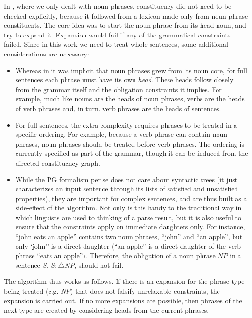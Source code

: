 \documentclass{llncs}
\newcommand{\obligation}[2]{\textit{#1} : \triangle \textit{#2}}
\begin{document}
In \cite {DM12}, where we only dealt with noun phrases, constituency did not need to be checked explicitly, because it followed from a lexicon made only from noun phrase constituents. The core idea was to start the noun phrase from its head noun, and try to expand it. Expansion would fail if any of the grammatical constraints failed. Since in this work we need to treat whole sentences, some additional considerations are necessary:
\begin{itemize}
  \item Whereas in \cite {DM12} it was implicit that noun phrases grew from its noun core, for full sentences each phrase must have its own \emph{head}. These heads follow closely from the grammar itself and the obligation constraints it implies. For example, much like nouns are the heads of noun phrases, verbs are the heads of verb phrases and, in turn, verb phrases are the heads of sentences.
  
  \item For full sentences, the extra complexity requires phrases to be treated in a specific ordering. For example, because a verb phrase can contain noun phrases, noun phrases should be treated before verb phrases. The ordering is currently specified as part of the grammar, though it can be induced from the directed constituency graph.
  
  \item While the PG formalism per se does not care about syntactic trees (it just characterizes an input sentence through its lists of satisfied and unsatisfied properties), they are important for complex sentences, and are thus built as a side-effect of the algorithm. Not only is this handy to the traditional way in which linguists are used to thinking of a parse result, but it is also useful to ensure that the constraints apply on immediate daughters only. For instance, ``john eats an apple'' contains two noun phrases, ``john'' and ``an apple'', but only `john'' is a direct daughter (``an apple'' is a direct daughter of the verb phrase ``eats an apple''). Therefore, the obligation of a noun phrase $\textit{NP}$ in a sentence $S$, $\obligation{S}{NP}$, should not fail.
\end{itemize}

The algorithm thus works as follows. If there is an expansion for the phrase type being treated (e.g. \textit{NP}) that does not falsify unrelaxable constraints, the expansion is carried out. If no more expansions are possible, then phrases of the next type are created by considering heads from the current phrases.
\end{document}
